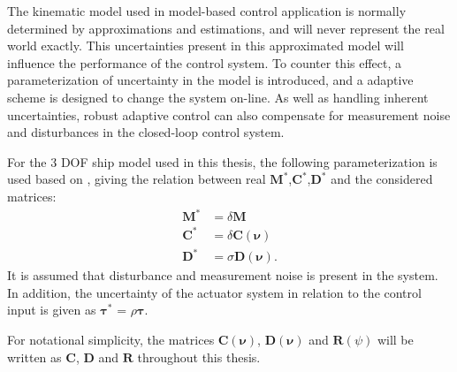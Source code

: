 
The kinematic model used in model-based control application is normally determined by approximations and estimations, and will never represent the real world exactly. This uncertainties present in this approximated model will influence the performance of the control system. To counter this effect, a parameterization of uncertainty in the model is introduced, and a adaptive scheme is designed to change the system on-line. As well as handling inherent uncertainties, robust adaptive control can also compensate for measurement noise and disturbances in the closed-loop control system.  

For the 3 DOF ship model used in this thesis, the following parameterization is used based on \cite{Sørensen2015}, giving the relation between real $\boldsymbol{M}^*$,$\boldsymbol{C}^*$,$\boldsymbol{D}^*$ and the considered matrices:
\begin{align}\label{eq:uncert}
\bm{M}^* &= \delta\boldsymbol{M} \\
\bm{C}^* &= \delta\boldsymbol{C(\nu)} \\
\bm{D}^* &= \sigma\boldsymbol{D(\nu)}. 
\end{align}
It is assumed that disturbance and measurement noise is present in the system. In addition, the uncertainty of the actuator system in relation to the control input is given as $\boldsymbol{\tau}^*$ = $\rho \boldsymbol{\tau}$.

For notational simplicity, the matrices $\boldsymbol{C(\nu)}$, $\boldsymbol{D(\nu)}$ and $\boldsymbol{R}(\psi)$ will be written as $\boldsymbol{C}$, $\boldsymbol{D}$ and  $\boldsymbol{R}$ throughout this thesis.